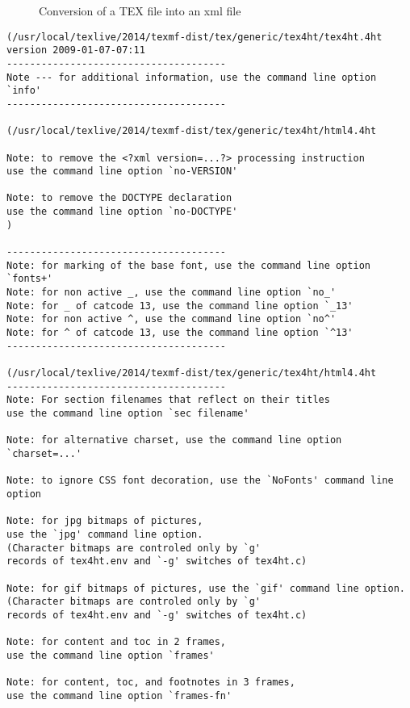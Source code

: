 \raggedbottom{}


\begin{figure}[!htb]
\centering
{}
\caption{\label{fig:tex2xml}Conversion of a TEX file into an xml file}
\end{figure}

\begin{Verbatim}[fontsize=\tiny]
(/usr/local/texlive/2014/texmf-dist/tex/generic/tex4ht/tex4ht.4ht
version 2009-01-07-07:11
--------------------------------------
Note --- for additional information, use the command line option `info'
--------------------------------------

(/usr/local/texlive/2014/texmf-dist/tex/generic/tex4ht/html4.4ht

Note: to remove the <?xml version=...?> processing instruction 
use the command line option `no-VERSION'

Note: to remove the DOCTYPE declaration 
use the command line option `no-DOCTYPE'
)

--------------------------------------
Note: for marking of the base font, use the command line option `fonts+'
Note: for non active _, use the command line option `no_'
Note: for _ of catcode 13, use the command line option `_13'
Note: for non active ^, use the command line option `no^'
Note: for ^ of catcode 13, use the command line option `^13'
--------------------------------------

(/usr/local/texlive/2014/texmf-dist/tex/generic/tex4ht/html4.4ht
--------------------------------------
Note: For section filenames that reflect on their titles 
use the command line option `sec filename'

Note: for alternative charset, use the command line option `charset=...'

Note: to ignore CSS font decoration, use the `NoFonts' command line option

Note: for jpg bitmaps of pictures, 
use the `jpg' command line option. 
(Character bitmaps are controled only by `g' 
records of tex4ht.env and `-g' switches of tex4ht.c) 

Note: for gif bitmaps of pictures, use the `gif' command line option. 
(Character bitmaps are controled only by `g' 
records of tex4ht.env and `-g' switches of tex4ht.c) 

Note: for content and toc in 2 frames, 
use the command line option `frames'

Note: for content, toc, and footnotes in 3 frames, 
use the command line option `frames-fn'


\end{Verbatim}
